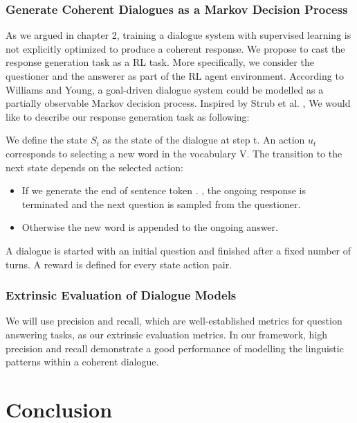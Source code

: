 \documentclass[bsc,frontabs,twoside,singlespacing,parskip,deptreport]{infthesis}     %
\begin{document}
\subsection{Generate Coherent Dialogues as a Markov Decision Process}
\noindent
As we argued in chapter 2, training a dialogue system with supervised learning is not explicitly optimized to produce a coherent response. We propose to cast the response generation task as a RL task. More specifically, we consider the questioner and the answerer as part of the RL agent environment. According to Williams and Young\cite{williams2007partially}, a goal-driven dialogue system could be modelled as a partially observable Markov decision process. Inspired by Strub et al. \cite{strub2017end}, We would like to describe our response generation task as following:

We define the state $S_t$ as the state of the dialogue at step t. An action $u_t$ corresponds to selecting a new word in the vocabulary V. The transition to the next state depends on the selected action:

\begin{itemize}
\item If we generate the end of sentence token . , the ongoing response is terminated and the next question is sampled from the questioner.
\item Otherwise the new word is appended to the ongoing answer.
\end{itemize}

A dialogue is started with an initial question and finished after a fixed number of turns. A reward is defined for every state action pair. 

\subsection{Extrinsic Evaluation of Dialogue Models}
\noindent

We will use precision and recall, which are well-established metrics for question answering tasks, as our extrinsic evaluation metrics. In our framework, high precision and recall demonstrate a good performance of modelling the linguistic patterns within a coherent dialogue.





\chapter{Conclusion}
\end{document}
